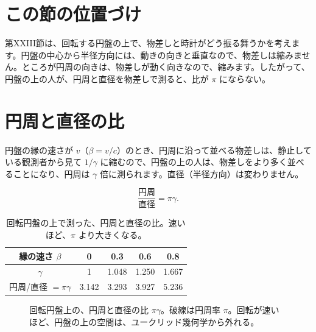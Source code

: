 \documentclass[a4paper,11pt,openany]{ltjsbook}
\begin{document}
\section{この節の位置づけ}

第XXIII節は、回転する円盤の上で、物差しと時計がどう振る舞うかを考えます。円盤の中心から半径方向には、動きの向きと垂直なので、物差しは縮みません。ところが円周の向きは、物差しが動く向きなので、縮みます。したがって、円盤の上の人が、円周と直径を物差しで測ると、比が $\pi$ にならない。

\section{円周と直径の比}

円盤の縁の速さが $v$（$\beta=v/c$）のとき、円周に沿って並べる物差しは、静止している観測者から見て $1/\gamma$ に縮むので、円盤の上の人は、物差しをより多く並べることになり、円周は $\gamma$ 倍に測られます。直径（半径方向）は変わりません。

\[
\frac{\text{円周}}{\text{直径}}=\pi\gamma .
\]

\begin{table}[htbp]
\centering
\begin{tabular}{c|cccc}
\toprule
縁の速さ $\beta$ & 0 & 0.3 & 0.6 & 0.8\\
\midrule
$\gamma$ & 1 & 1.048 & 1.250 & 1.667\\
円周/直径 $=\pi\gamma$ & 3.142 & 3.293 & 3.927 & 5.236\\
\bottomrule
\end{tabular}
\caption{回転円盤の上で測った、円周と直径の比。速いほど、$\pi$ より大きくなる。}
\end{table}

\begin{figure}[htbp]
\centering
{}
\caption{回転円盤上の、円周と直径の比 $\pi\gamma$。破線は円周率 $\pi$。回転が速いほど、円盤の上の空間は、ユークリッド幾何学から外れる。}
\end{figure}
\end{document}

